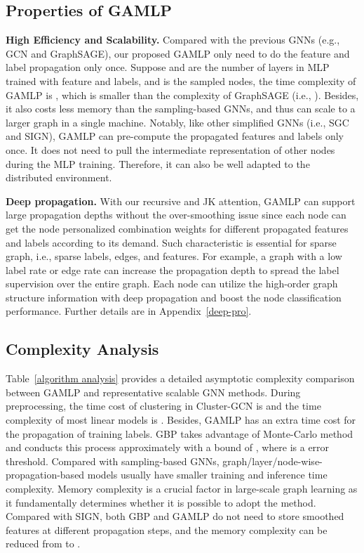 \documentclass[sigconf]{acmart}
\newcommand{\sys}{\textsc{GAMLP}\xspace}
\begin{document}
\subsection{Properties of \sys}
\noindent\textbf{High Efficiency and Scalability.}
Compared with the previous GNNs (e.g., GCN and GraphSAGE), our proposed GAMLP only need to do the feature and label propagation only once. Suppose  and  are the number of layers in MLP trained with feature and labels, and  is the sampled nodes, the time complexity of GAMLP is , which is smaller than the complexity of GraphSAGE (i.e., ). Besides, it also costs less memory than the sampling-based GNNs, and thus can scale to a larger graph in a single machine. 
Notably, like other simplified GNNs (i.e., SGC and SIGN),  GAMLP can pre-compute the propagated features and labels only once. It does not need to pull the intermediate representation of other nodes during the MLP training. Therefore, it can also be well adapted to the distributed environment. 


\noindent\textbf{Deep propagation.}
With our recursive and JK attention, GAMLP can support large propagation depths without the over-smoothing issue since each node can get the node personalized combination weights for different propagated features and labels according to its demand. Such characteristic is essential for sparse graph, i.e., sparse labels, edges, and features. For example, a graph with a low label rate or edge rate can increase the propagation depth to spread the label supervision over the entire graph. Each node can utilize the high-order graph structure information with deep propagation and boost the node classification performance. Further details are in Appendix~\ref{deep-pro}.

\subsection{Complexity Analysis}
\label{complexity}
Table~\ref{algorithm analysis} provides a detailed asymptotic complexity comparison between GAMLP and representative scalable GNN methods.
During preprocessing, the time cost of clustering in Cluster-GCN is  and the time complexity of most linear models is . 
Besides, GAMLP has an extra time cost  for the propagation of training labels.
GBP takes advantage of Monte-Carlo method and conducts this process approximately with a bound of , where  is a error threshold. 
Compared with sampling-based GNNs, graph/layer/node-wise-propagation-based models usually have smaller training and inference time complexity.
Memory complexity is a crucial factor in large-scale graph learning as it fundamentally determines whether it is possible to adopt the method.
Compared with SIGN, both GBP and GAMLP do not need to store smoothed features at different propagation steps, and the memory complexity can be reduced from  to .
\end{document}
